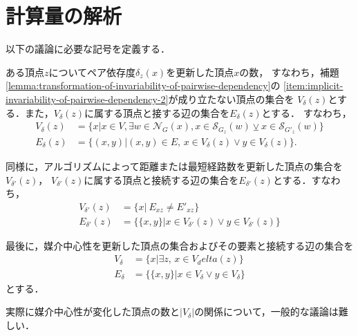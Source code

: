 \chapter{計算量の解析}
\label{chap:complexity-analysis}

以下の議論に必要な記号を定義する．

\begin{definition}
  ある頂点$z$についてペア依存度$\delta_z(x)$を更新した頂点$x$の数，
  すなわち，補題\ref{lemma:transformation-of-invariability-of-pairwise-dependency}の
  \ref{item:implicit-invariability-of-pairwise-dependency-2}が成り立たない頂点の集合を
  $V_\delta(z)$とする．また，$V_\delta(z)$に属する頂点と接する辺の集合を$E_\delta(z)$とする．
  すなわち，
  \begin{equation*}
    \begin{aligned}
      V_\delta(z)&=\{x|x\in V,\exists w\in\mathcal{N}_G(x),
      x\in\mathcal{S}_{G_z}(w)\veebar x\in\mathcal{S}_{G'_z}(w)\}\\
      E_\delta(z)&=\{(x,y)|(x,y)\in E,\,x\in V_\delta(z)\lor y\in V_\delta(z)\}.
    \end{aligned}
  \end{equation*}

  同様に，アルゴリズムによって距離または最短経路数を更新した頂点の集合を$V_{\delta'}(z)$，
  $V_{\delta'}(z)$に属する頂点と接続する辺の集合を$E_{\delta'}(z)$とする．すなわち，
  \begin{equation*}
    \begin{aligned}
      V_{\delta'}(z)&=\{x|\:E_{xz}\neq E'_{xz}\} \\
      E_{\delta'}(z)&=\{\{x,y\}|x\in V_{\delta'}(z)\lor y\in V_{\delta'}(z)\}
    \end{aligned}
  \end{equation*}

  最後に，媒介中心性を更新した頂点の集合およびその要素と接続する辺の集合を
  \begin{equation*}
    \begin{aligned}
      V_\delta&=\{x|\exists z,\,x\in V_delta(z)\} \\
      E_\delta&=\{\{x,y\}|x\in V_\delta\lor y\in V_\delta\}
    \end{aligned}
  \end{equation*}
  とする．
\end{definition}

実際に媒介中心性が変化した頂点の数と$\lvert V_\delta\rvert$の関係について，一般的な議論は難しい．

